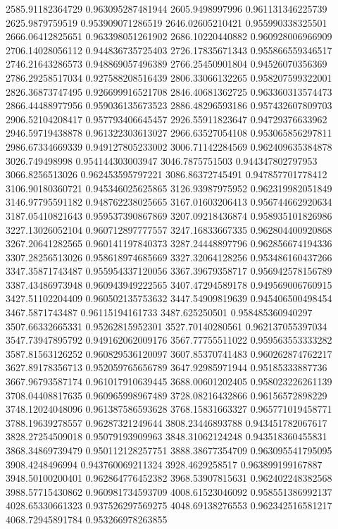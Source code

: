{2585.91182364729 0.963095287481944
2605.9498997996 0.961131346225739
2625.9879759519 0.953909071286519
2646.02605210421 0.955990338325501
2666.06412825651 0.963398051261902
2686.10220440882 0.960928006966909
2706.14028056112 0.944836735725403
2726.17835671343 0.955866559346517
2746.21643286573 0.948869057496389
2766.25450901804 0.94526070356369
2786.29258517034 0.927588208516439
2806.33066132265 0.958207599322001
2826.36873747495 0.926699916521708
2846.40681362725 0.963360313574473
2866.44488977956 0.959036135673523
2886.48296593186 0.957432607809703
2906.52104208417 0.957793406645457
2926.55911823647 0.94729376633962
2946.59719438878 0.961322303613027
2966.63527054108 0.953065856297811
2986.67334669339 0.949127805233002
3006.71142284569 0.962409635384878
3026.749498998 0.954144303003947
3046.7875751503 0.944347802797953
3066.8256513026 0.962453595797221
3086.86372745491 0.947857701778412
3106.90180360721 0.945346025625865
3126.93987975952 0.962319982051849
3146.97795591182 0.948762238025665
3167.01603206413 0.956744662920634
3187.05410821643 0.959537390867869
3207.09218436874 0.958935101826986
3227.13026052104 0.960712897777557
3247.16833667335 0.962804400920868
3267.20641282565 0.960141197840373
3287.24448897796 0.962856674194336
3307.28256513026 0.958618974685669
3327.32064128256 0.953486160437266
3347.35871743487 0.955954337120056
3367.39679358717 0.956942578156789
3387.43486973948 0.960943949222565
3407.47294589178 0.949569006760915
3427.51102204409 0.960502135753632
3447.54909819639 0.945406500498454
3467.5871743487 0.96115194161733
3487.625250501 0.958485360940297
3507.66332665331 0.95262815952301
3527.70140280561 0.962137055397034
3547.73947895792 0.949162062009176
3567.77755511022 0.959563553333282
3587.81563126252 0.960829536120097
3607.85370741483 0.960262874762217
3627.89178356713 0.952059765656789
3647.92985971944 0.95185333887736
3667.96793587174 0.961017910639445
3688.00601202405 0.958023226261139
3708.04408817635 0.960965998967489
3728.08216432866 0.96156572898229
3748.12024048096 0.961387586593628
3768.15831663327 0.965771019458771
3788.19639278557 0.96287321249644
3808.23446893788 0.943451782067617
3828.27254509018 0.95079193909963
3848.31062124248 0.943518360455831
3868.34869739479 0.950112128257751
3888.38677354709 0.963095541795095
3908.4248496994 0.943760069211324
3928.4629258517 0.963899199167887
3948.50100200401 0.962864776452382
3968.53907815631 0.962402248382568
3988.57715430862 0.960981734593709
4008.61523046092 0.958551386992137
4028.65330661323 0.937526297569275
4048.69138276553 0.962342516581217
4068.72945891784 0.953266978263855
}
